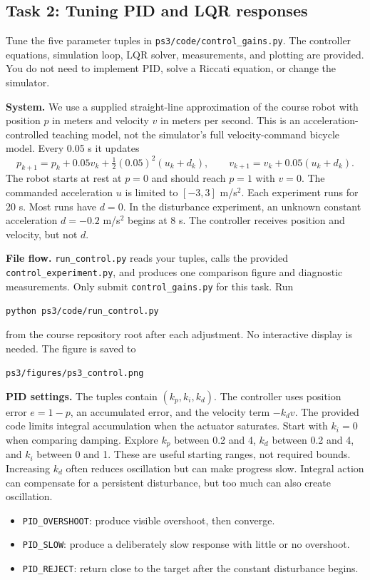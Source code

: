 \documentclass[11pt]{article}
\begin{document}
\clearpage
\subsection{Task 2: Tuning PID and LQR responses}
Tune the five parameter tuples in \texttt{ps3/code/control\_gains.py}.
The controller equations, simulation loop, LQR solver, measurements, and
plotting are provided. You do not need to implement PID, solve a
Riccati equation, or change the simulator.

\textbf{System.} We use a supplied straight-line approximation of the
course robot with position $p$ in meters and velocity $v$ in meters per
second. This is an acceleration-controlled teaching model, not the
simulator's full velocity-command bicycle model. Every 0.05 s it updates
\[
p_{k+1}=p_k+0.05v_k+\tfrac12(0.05)^2(u_k+d_k),
\qquad v_{k+1}=v_k+0.05(u_k+d_k).
\]
The robot starts at rest at $p=0$ and should reach $p=1$ with $v=0$.
The commanded acceleration $u$ is limited to $[-3,3]$ m/s$^2$.
Each experiment runs for 20 s. Most runs have $d=0$. In the disturbance
experiment, an unknown constant acceleration $d=-0.2$ m/s$^2$ begins
at 8 s. The controller receives position and velocity, but not $d$.

\textbf{File flow.} \texttt{run\_control.py} reads your tuples, calls the
provided \texttt{control\_experiment.py}, and produces one comparison
figure and diagnostic measurements. Only submit \texttt{control\_gains.py}
for this task. Run
\begin{center}\texttt{python ps3/code/run\_control.py}\end{center}
from the course repository root after each adjustment. No interactive
display is needed. The figure is saved to
\begin{center}\texttt{ps3/figures/ps3\_control.png}\end{center}

\textbf{PID settings.} The tuples contain $(k_p,k_i,k_d)$. The controller
uses position error $e=1-p$, an accumulated error, and the velocity
term $-k_dv$. The provided code limits integral accumulation when the
actuator saturates. Start with $k_i=0$ when comparing damping.
Explore $k_p$ between 0.2 and 4, $k_d$ between 0.2 and 4, and $k_i$
between 0 and 1. These are useful starting ranges, not required bounds.
Increasing $k_d$ often reduces oscillation but can make progress slow.
Integral action can compensate for a persistent disturbance, but too
much can also create oscillation.

\begin{itemize}
\item \texttt{PID\_OVERSHOOT}: produce visible overshoot, then converge.
\item \texttt{PID\_SLOW}: produce a deliberately slow response with
      little or no overshoot.
\item \texttt{PID\_REJECT}: return close to the target after the
      constant disturbance begins.
\end{itemize}
\end{document}
